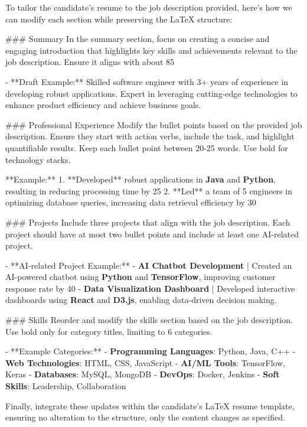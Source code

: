 To tailor the candidate's resume to the job description provided, here's how we can modify each section while preserving the LaTeX structure:

### Summary
In the summary section, focus on creating a concise and engaging introduction that highlights key skills and achievements relevant to the job description. Ensure it aligns with about 85%

- **Draft Example:** Skilled software engineer with 3+ years of experience in developing robust applications. Expert in leveraging cutting-edge technologies to enhance product efficiency and achieve business goals.

### Professional Experience
Modify the bullet points based on the provided job description. Ensure they start with action verbs, include the task, and highlight quantifiable results. Keep each bullet point between 20-25 words. Use bold for technology stacks.

**Example:**
1. **Developed** robust applications in \textbf{Java} and \textbf{Python}, resulting in reducing processing time by 25%
2. **Led** a team of 5 engineers in optimizing database queries, increasing data retrieval efficiency by 30%

### Projects
Include three projects that align with the job description. Each project should have at most two bullet points and include at least one AI-related project.

- **AI-related Project Example:**
  - \textbf{AI Chatbot Development} | Created an AI-powered chatbot using \textbf{Python} and \textbf{TensorFlow}, improving customer response rate by 40%
  - \textbf{Data Visualization Dashboard} | Developed interactive dashboards using \textbf{React} and \textbf{D3.js}, enabling data-driven decision making.

### Skills
Reorder and modify the skills section based on the job description. Use bold only for category titles, limiting to 6 categories.

- **Example Categories:**
  - \textbf{Programming Languages}: Python, Java, C++
  - \textbf{Web Technologies}: HTML, CSS, JavaScript
  - \textbf{AI/ML Tools}: TensorFlow, Keras
  - \textbf{Databases}: MySQL, MongoDB
  - \textbf{DevOps}: Docker, Jenkins
  - \textbf{Soft Skills}: Leadership, Collaboration

Finally, integrate these updates within the candidate's LaTeX resume template, ensuring no alteration to the structure, only the content changes as specified.